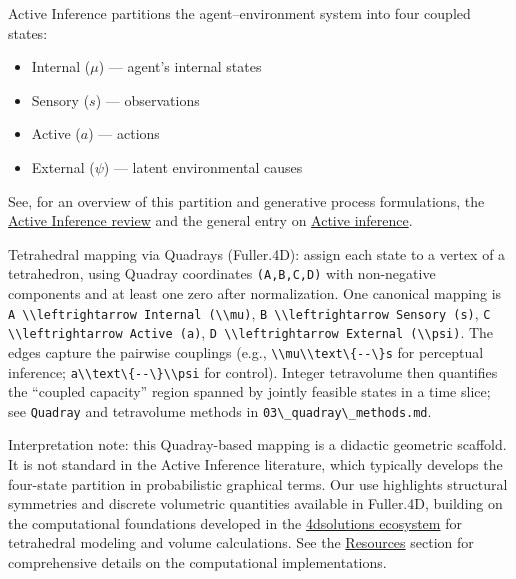 \documentclass[
  10pt,
]{article}
\newcommand{\passthrough}[1]{#1}
\providecommand{\tightlist}{%
  \setlength{\itemsep}{0pt}\setlength{\parskip}{0pt}}
\begin{document}
Active Inference partitions the agent--environment system into four
coupled states:

\begin{itemize}
\tightlist
\item
  Internal (\(\mu\)) --- agent's internal states
\item
  Sensory (\(s\)) --- observations
\item
  Active (\(a\)) --- actions
\item
  External (\(\psi\)) --- latent environmental causes
\end{itemize}

See, for an overview of this partition and generative process
formulations, the
\href{https://discovery.ucl.ac.uk/id/eprint/10176959/1/1-s2.0-S1571064523001094-main.pdf}{Active
Inference review} and the general entry on
\href{https://en.wikipedia.org/wiki/Active_inference}{Active inference}.

Tetrahedral mapping via Quadrays (Fuller.4D): assign each state to a
vertex of a tetrahedron, using Quadray coordinates
\passthrough{\lstinline!(A,B,C,D)!} with non-negative components and at
least one zero after normalization. One canonical mapping is
\passthrough{\lstinline!A \\leftrightarrow Internal (\\mu)!},
\passthrough{\lstinline!B \\leftrightarrow Sensory (s)!},
\passthrough{\lstinline!C \\leftrightarrow Active (a)!},
\passthrough{\lstinline!D \\leftrightarrow External (\\psi)!}. The edges
capture the pairwise couplings (e.g.,
\passthrough{\lstinline!\\mu\\text\{--\}s!} for perceptual inference;
\passthrough{\lstinline!a\\text\{--\}\\psi!} for control). Integer
tetravolume then quantifies the ``coupled capacity'' region spanned by
jointly feasible states in a time slice; see
\passthrough{\lstinline!Quadray!} and tetravolume methods in
\passthrough{\lstinline!03\_quadray\_methods.md!}.

Interpretation note: this Quadray-based mapping is a didactic geometric
scaffold. It is not standard in the Active Inference literature, which
typically develops the four-state partition in probabilistic graphical
terms. Our use highlights structural symmetries and discrete volumetric
quantities available in Fuller.4D, building on the computational
foundations developed in the
\href{https://github.com/4dsolutions}{4dsolutions ecosystem} for
tetrahedral modeling and volume calculations. See the
\href{07_resources.md}{Resources} section for comprehensive details on
the computational implementations.
\end{document}

